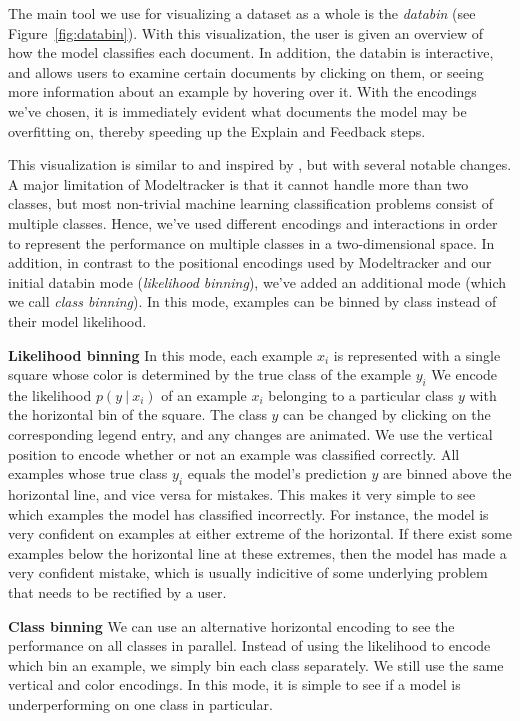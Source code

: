 \documentclass{chi2009}
\begin{document}
The main tool we use for visualizing a dataset as a whole is the
\textit{databin} (see Figure~\ref{fig:databin}). With this visualization, the
user is given an overview of how the model classifies each document. In
addition, the databin is interactive, and allows users to examine certain
documents by clicking on them, or seeing more information about an example by
hovering over it. With the encodings we've chosen, it is immediately evident
what documents the model may be overfitting on, thereby speeding up the Explain
and Feedback steps.

This visualization is similar to and inspired by \cite{modeltracker}, but with
several notable changes. A major limitation of Modeltracker is that it cannot
handle more than two classes, but most non-trivial machine learning
classification problems consist of multiple classes. Hence, we've used different
encodings and interactions in order to represent the performance on multiple
classes in a two-dimensional space. In addition, in contrast to the positional
encodings used by Modeltracker and our initial databin mode (\textit{likelihood
binning}), we've added an additional mode (which we call \textit{class
binning}). In this mode, examples can be binned by class instead of their model
likelihood. 

\textbf{Likelihood binning} In this mode, each example $x_i$ is represented with
a single square whose color is determined by the true class of the example $y_i$
We encode the likelihood $p(y\ |\ x_i)$ of an example $x_i$ belonging to a
particular class $y$ with the horizontal bin of the square. The class $y$
can be changed by clicking on the corresponding legend entry, and any changes
are animated. We use the vertical position to encode whether or not an example
was classified correctly. All examples whose true class $y_i$ equals the model's
prediction $y$ are binned above the horizontal line, and vice versa for
mistakes. This makes it very simple to see which examples the model has
classified incorrectly. For instance, the model is very confident on examples at
either extreme of the horizontal. If there exist some examples below the
horizontal line at these extremes, then the model has made a very confident
mistake, which is usually indicitive of some underlying problem that needs to be
rectified by a user.

\textbf{Class binning} We can use an alternative horizontal encoding to see the
performance on all classes in parallel. Instead of using the likelihood to
encode which bin an example, we simply bin each class separately. We still use
the same vertical and color encodings. In this mode, it is simple to see if a
model is underperforming on one class in particular.
\end{document}

